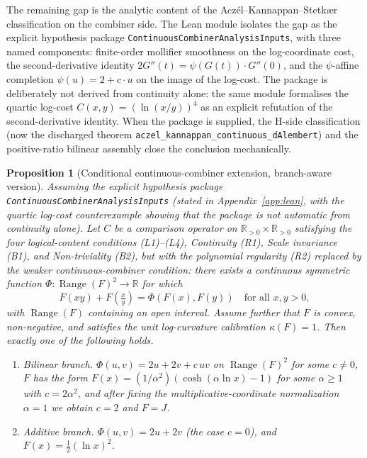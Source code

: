 \documentclass[11pt,a4paper]{article}
\newtheorem{proposition}[theorem]{Proposition}
\theoremstyle{definition}
\theoremstyle{remark}
\begin{document}
The remaining gap is the analytic content of the Acz\'el--Kannappan--Stetk{\ae}r
classification on the combiner side. The Lean module isolates the gap
as the explicit hypothesis package
\texttt{ContinuousCombinerAnalysisInputs}, with three named components:
finite-order mollifier smoothness on the log-coordinate cost, the
second-derivative identity
$2 G''(t) = \psi(G(t)) \cdot G''(0)$, and the $\psi$-affine completion
$\psi(u) = 2 + c \cdot u$ on the image of the log-cost. The package is
deliberately not derived from continuity alone: the same module
formalises the quartic log-cost $C(x, y) = (\ln(x/y))^4$ as an
explicit refutation of the second-derivative identity. When the
package is supplied, the H-side classification (now the discharged
theorem \texttt{aczel\_kannappan\_continuous\_dAlembert}) and the
positive-ratio bilinear assembly close the conclusion mechanically.

\begin{proposition}[Conditional continuous-combiner extension,
branch-aware version]
\label{prop:continuous-combiner-extension}
\emph{Assuming the explicit hypothesis package
\texttt{ContinuousCombinerAnalysisInputs}
(stated in Appendix~\ref{app:lean}, with the quartic log-cost
counterexample showing that the package is not automatic from
continuity alone).}
Let $C$ be a comparison operator on $\mathbb{R}_{>0} \times
\mathbb{R}_{>0}$ satisfying the four logical-content conditions
(L1)--(L4), Continuity (R1), Scale invariance (B1), and Non-triviality
(B2), but with the polynomial regularity (R2) replaced by the weaker
continuous-combiner condition: there exists a continuous symmetric
function $\Phi : \operatorname{Range}(F)^2 \to \mathbb{R}$ for which
\[
F(xy) + F\!\left(\tfrac{x}{y}\right) = \Phi(F(x), F(y))
\quad \text{for all } x, y > 0,
\]
with $\operatorname{Range}(F)$ containing an open interval. Assume
further that $F$ is convex, non-negative, and satisfies the unit
log-curvature calibration $\kappa(F) = 1$. Then exactly one of the
following holds.
\begin{enumerate}[label=(\arabic*), leftmargin=*]
\item \emph{Bilinear branch.} $\Phi(u, v) = 2u + 2v + c\,uv$ on
$\operatorname{Range}(F)^2$ for some $c \neq 0$, $F$ has the form
$F(x) = (1/\alpha^2)(\cosh(\alpha \ln x) - 1)$ for some $\alpha \geq 1$
with $c = 2\alpha^2$, and after fixing the multiplicative-coordinate
normalization $\alpha = 1$ we obtain $c = 2$ and $F = J$.
\item \emph{Additive branch.} $\Phi(u, v) = 2u + 2v$ (the case $c = 0$),
and $F(x) = \tfrac{1}{2}(\ln x)^2$.
\end{enumerate}
\end{proposition}
\end{document}

